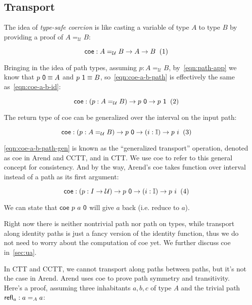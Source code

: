 \subsection{Transport}
\label{subsec:coe}

The idea of \textit{type-safe coercion} is like
casting a variable of type $A$ to type $B$ by providing a proof
of $A =_{\mathcal U} B$:

\[
  \textsf{coe} : A =_{\mathcal U} B \rightarrow A \rightarrow B
  \xtag \label{eqn:coe-a-b-id}
\]

Bringing in the idea of path types,
assuming $p : A =_{\mathcal U} B$, by~\ref{eqn:path-app}
we know that $p \ \textsf 0 \equiv A$ and
$p \ \textsf 1 \equiv B$,
so~\ref{eqn:coe-a-b-path} is effectively the same
as~\ref{eqn:coe-a-b-id}:

\[
  \textsf{coe} : (p : A =_{\mathcal U} B) \rightarrow p \ \textsf 0
  \rightarrow p \ \textsf 1
  \xtag \label{eqn:coe-a-b-path}
\]

The return type of \textsf{coe} can be generalized over
the interval on the input path:

\[
  \textsf{coe} : (p : A =_{\mathcal U} B) \rightarrow p \ \textsf 0
  \rightarrow (i : \mathbb I) \rightarrow p \ i
  \xtag \label{eqn:coe-a-b-path-gen}
\]

\ref{eqn:coe-a-b-path-gen} is known as the ``generalized transport''
operation, denoted as \textsf{coe} in Arend and CCTT,
and  in CTT.
We use \textsf{coe} to refer to this general concept for consistency.
And by the way,
Arend's \textsf{coe} takes function over interval instead
of a path as its first argument:

\[
  \textsf{coe} : (p : I \rightarrow \mathcal U)
  \rightarrow p \ \textsf 0
  \rightarrow (i : \mathbb I) \rightarrow p \ i
  \xtag
\]

We can state that $\textsf{coe}\ p\ a\ \textsf 0$ will give $a$ back
(i.e. reduce to $a$).

Right now there is neither nontrivial path nor path on types,
while transport along identity paths is just a fancy version
of the identity function, thus we do not need to worry about the
computation of \textsf{coe} yet.
We further discuss \textsf{coe} in~\cref{sec:ua}.

In CTT and CCTT, we cannot transport along paths between paths,
but it's not the case in Arend.
Arend uses \textsf{coe} to prove path symmetry and transitivity.
Here's a proof, assuming three inhabitants $a, b, c$ of type $A$
and the trivial path $\textsf{refl}_a : a =_A a$:

